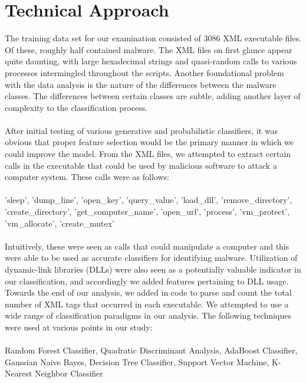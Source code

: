 \documentclass{article}
\begin{document}
\section{Technical Approach}
The training data set for our examination consisted of 3086 XML executable files. Of these, roughly half contained malware. The XML files on first glance appear quite daunting, with large hexadecimal strings and quasi-random calls to various processes intermingled throughout the scripts. Another foundational problem with the data analysis is the nature of the differences between the malware classes. The differences between certain classes are subtle, adding another layer of complexity to the classification process.\\\\
After initial testing of various generative and probabilistic classifiers, it was obvious that proper feature selection would be the primary manner in which we could improve the model. From the XML files, we attempted to extract certain calls in the executable that could be used by malicious software to attack a computer system. These calls were as follows:\\\\
'sleep', 'dump\_line', 'open\_key', 'query\_value', 'load\_dll', 'remove\_directory', 'create\_directory', 'get\_computer\_name', 'open\_url', 'process', 'vm\_protect', 'vm\_allocate', 'create\_mutex'\\\\
Intuitively, these were seen as calls that could manipulate a computer and this were able to be used as accurate classifiers for identifying malware. Utilization of dynamic-link libraries (DLLs) were also seen as a potentially valuable indicator in our classification, and accordingly we added features pertaining to DLL usage. Towards the end of our analysis, we added in code to parse and count the total number of XML tags that occurred in each executable. 
We attempted to use a wide range of classification paradigms in our analysis. The following techniques were used at various points in our study:\\\\
Random Forest Classifier, Quadratic Discriminant Analysis, AdaBoost Classifier,  Gaussian Naive Bayes, Decision Tree Classifier, Support Vector Machine, K-Nearest Neighbor Classifier
\end{document}
